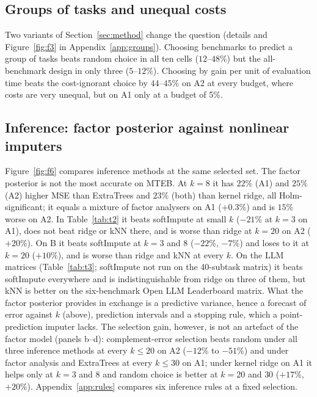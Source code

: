 \begin{table}[t]
\centering\scriptsize\setlength{\tabcolsep}{3pt}

\caption{Primary comparisons on MTEB-A1 and A2: relative change in held-out MSE (\%), first named minus second (negative: first is better), with 95\% unadjusted intervals over held-out models; \textbf{bold}: Holm-adjusted $p<0.05$ over the full family of each matrix (P1--P8), of which 8 of the 12 comparisons are shown (the rest: Appendix~\ref{app:t2full}). $\dagger$: added after the pilot. Selectors use factor-posterior inference except where named.}
\label{tab:t2}
\end{table}

\subsection{Groups of tasks and unequal costs}
Two variants of Section~\ref{sec:method} change the question (details and Figure~\ref{fig:f3} in Appendix~\ref{app:groups}).
Choosing benchmarks to predict a group of tasks beats random choice in all ten cells ($12$--$48\%$) but the all-benchmark design in only three ($5$--$12\%$).
Choosing by gain per unit of evaluation time beats the cost-ignorant choice by $44$--$45\%$ on A2 at every budget, where costs are very unequal, but on A1 only at a budget of 5\%.

\subsection{Inference: factor posterior against nonlinear imputers}
Figure~\ref{fig:f6} compares inference methods at the same selected set.
The factor posterior is not the most accurate on MTEB.
At $k=8$ it has $22\%$ (A1) and $25\%$ (A2) higher MSE than ExtraTrees \citep{geurts2006extremely} and $23\%$ (both) than kernel ridge, all Holm-significant; it equals a mixture of factor analysers on A1 ($+0.3\%$) and is $15\%$ worse on A2.
In Table~\ref{tab:t2} it beats softImpute at small $k$ ($-21\%$ at $k=3$ on A1), does not beat ridge or kNN there, and is worse than ridge at $k=20$ on A2 ($+20\%$). On B it beats softImpute at $k=3$ and $8$ ($-22\%$, $-7\%$) and loses to it at $k=20$ ($+10\%$), and is worse than ridge and kNN at every $k$.
On the LLM matrices (Table~\ref{tab:t3}; softImpute not run on the 40-subtask matrix) it beats softImpute everywhere and is indistinguishable from ridge on three of them, but kNN is better on the six-benchmark Open LLM Leaderboard matrix.
What the factor posterior provides in exchange is a predictive variance, hence a forecast of error against $k$ (above), prediction intervals and a stopping rule, which a point-prediction imputer lacks.
The selection gain, however, is not an artefact of the factor model (panels b--d): complement-error selection beats random under all three inference methods at every $k\le20$ on A2 ($-12\%$ to $-51\%$) and under factor analysis and ExtraTrees at every $k\le30$ on A1; under kernel ridge on A1 it helps only at $k=3$ and $8$ and random choice is better at $k=20$ and $30$ ($+17\%$, $+20\%$).
Appendix~\ref{app:rules} compares six inference rules at a fixed selection.

